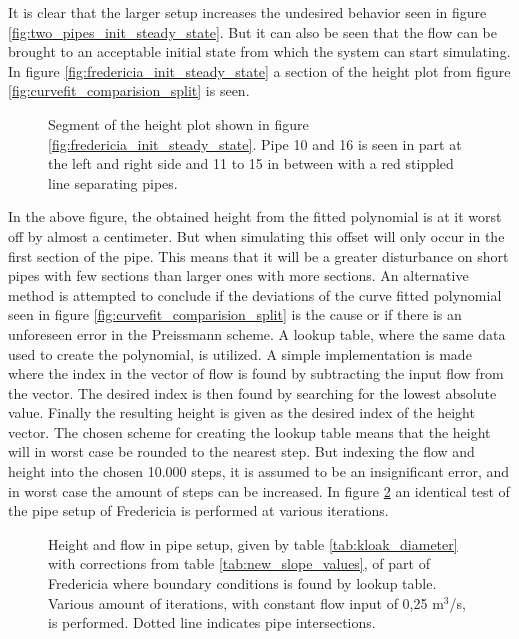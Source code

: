 It is clear that the larger setup increases the undesired behavior seen in figure \ref{fig:two_pipes_init_steady_state}. But it can also be seen that the flow can be brought to an acceptable initial state from which the system can start simulating. In figure \ref{fig:fredericia_init_steady_state} a section of the height plot from figure \ref{fig:curvefit_comparision_split} is seen. 

\begin{figure}[H]
 \centering
 
\caption{Segment of the height plot shown in figure \ref{fig:fredericia_init_steady_state}. Pipe 10 and 16 is seen in part at the left and right side and 11 to 15 in between with a red stippled line separating pipes.}
\label{fig:fredericia_init_steady_state_zoom}
\end{figure}

In the above figure, the obtained height from the fitted polynomial is at it worst off by almost a centimeter. But when simulating this offset will only occur in the first section of the pipe. This means that it will be a greater disturbance on short pipes with few sections than larger ones with more sections. An alternative method is attempted to conclude if the deviations of the curve fitted polynomial seen in figure \ref{fig:curvefit_comparision_split} is the cause or if there is an unforeseen error in the Preissmann scheme. A lookup table, where the same data used to create the polynomial, is utilized. A simple implementation is made where the index in the vector of flow is found by subtracting the input flow from the vector. The desired index is then found by searching for the lowest absolute value. Finally the resulting height is given as the desired index of the height vector. The chosen scheme for creating the lookup table means that the height will in worst case be rounded to the nearest step. But indexing the flow and height into the chosen 10.000 steps, it is assumed to be an insignificant error, and in worst case the amount of steps can be increased. In figure \ref{fig:fredericia_init_steady_state_lut} an identical test of the pipe setup of Fredericia is performed at various iterations.      

\begin{figure}[H]
 \centering
 
\caption{Height and flow in pipe setup, given by table \ref{tab:kloak_diameter} with corrections from table \ref{tab:new_slope_values}, of part of Fredericia where boundary conditions is found by lookup table. Various amount of iterations, with constant flow input of 0,25 $\text{m}^\text{3}$/s, is performed. Dotted line indicates pipe intersections.}
\label{fig:fredericia_init_steady_state_lut}
\end{figure}

